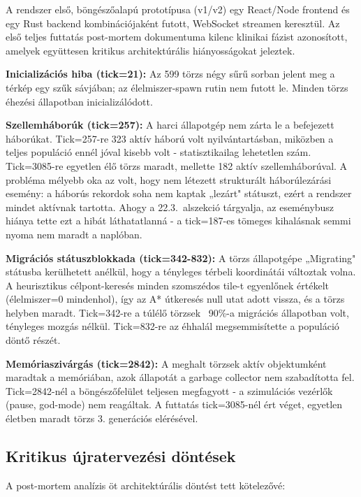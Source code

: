 ﻿\documentclass[a4paper,12pt]{report}
\begin{document}
A rendszer első, böngészőalapú prototípusa (v1/v2) egy React/Node frontend és egy Rust backend kombinációjaként futott, WebSocket streamen keresztül. Az első teljes futtatás post-mortem dokumentuma kilenc klinikai fázist azonosított, amelyek együttesen kritikus architektúrális hiányosságokat jeleztek.

\textbf{Inicializációs hiba (tick=21):} Az 599 törzs négy sűrű sorban jelent meg a térkép egy szűk sávjában; az élelmiszer-spawn rutin nem futott le. Minden törzs éhezési állapotban inicializálódott.

\textbf{Szellemháborúk (tick=257):} A harci állapotgép nem zárta le a befejezett háborúkat. Tick=257-re 323 aktív háború volt nyilvántartásban, miközben a teljes populáció ennél jóval kisebb volt - statisztikailag lehetetlen szám. Tick=3085-re egyetlen élő törzs maradt, mellette 182 aktív szellemháborúval. A probléma mélyebb oka az volt, hogy nem létezett strukturált háborúlezárási esemény: a háborús rekordok soha nem kaptak „lezárt" státuszt, ezért a rendszer mindet aktívnak tartotta. Ahogy a 22.3.~alszekció tárgyalja, az eseménybusz hiánya tette ezt a hibát láthatatlanná - a tick=187-es tömeges kihalásnak semmi nyoma nem maradt a naplóban.

\textbf{Migrációs státuszblokkada (tick=342-832):} A törzs állapotgépe „Migrating" státusba kerülhetett anélkül, hogy a tényleges térbeli koordinátái változtak volna. A heurisztikus célpont-keresés minden szomszédos tile-t egyenlőnek értékelt (élelmiszer=0 mindenhol), így az A* útkeresés null utat adott vissza, és a törzs helyben maradt. Tick=342-re a túlélő törzsek ~90\%-a migrációs állapotban volt, tényleges mozgás nélkül. Tick=832-re az éhhalál megsemmisítette a populáció döntő részét.

\textbf{Memóriaszivárgás (tick=2842):} A meghalt törzsek aktív objektumként maradtak a memóriában, azok állapotát a garbage collector nem szabadította fel. Tick=2842-nél a böngészőfelület teljesen megfagyott - a szimulációs vezérlők (pause, god-mode) nem reagáltak. A futtatás tick=3085-nél ért véget, egyetlen életben maradt törzs 3. generációs elérésével.

\subsection*{Kritikus újratervezési döntések}

A post-mortem analízis öt architektúrális döntést tett kötelezővé:
\end{document}
